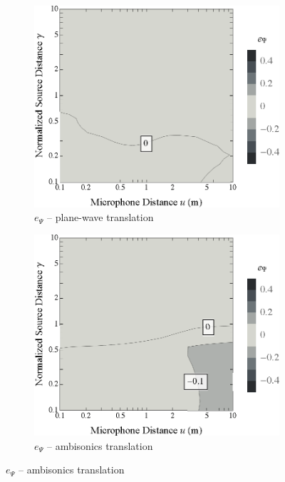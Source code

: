 \begin{figure}[tbp]
	\vspace{0.5cm}
	\begin{subfigure}[b]{0.49\textwidth}
        		\includegraphics[width=\textwidth]{07_characterization_extrapolation/figures/merimaa2005_d_contour_pwt.eps}
        		\caption{$e_\Psi$ -- plane-wave translation}
        		\label{fig:07_Characterization_Extrapolation:Diffuseness_Errors:PWT}
    	\end{subfigure}
	\hfill
    	\begin{subfigure}[b]{0.49\textwidth}
        		\includegraphics[width=\textwidth]{07_characterization_extrapolation/figures/merimaa2005_d_contour_sre.eps}
        		\caption{$e_\Psi$ -- ambisonics translation}
        		\label{fig:07_Characterization_Extrapolation:Diffuseness_Errors:SRE}
    	\end{subfigure}
	

\end{figure}
